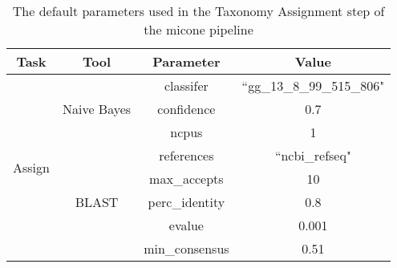 \begin{table}[H]
\centering
\small
\begin{tabular}{|c|c|c|c|}
\hline
\textbf{Task}           & \textbf{Tool}                & \textbf{Parameter} & \textbf{Value}            \\ \hline
\multirow{8}{*}{Assign} & \multirow{3}{*}{Naive Bayes} & classifer          & ``gg\_13\_8\_99\_515\_806" \\
                        &                              & confidence         & 0.7                       \\
                        &                              & ncpus              & 1                         \\ \cline{2-4}
                        & \multirow{5}{*}{BLAST}       & references         & ``ncbi\_refseq"            \\
                        &                              & max\_accepts       & 10                        \\
                        &                              & perc\_identity     & 0.8                       \\
                        &                              & evalue             & 0.001                     \\
                        &                              & min\_consensus     & 0.51                      \\ \hline
\end{tabular}
\caption{The default parameters used in the Taxonomy Assignment step of the \ac{micone} pipeline}
\label{tab:ta_parameters}
\end{table}

